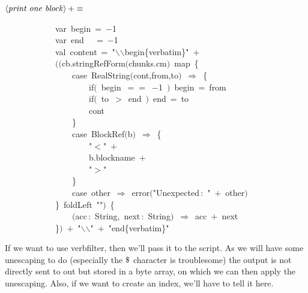 \documentclass[a4paper,12pt]{article}
\begin{document}
$\left<\mbox{\emph{print one block}}\right>+\equiv$
\begin{program}~~~~~~~~~~~~{\vem var}~begin~=~$-$1
\\~~~~~~~~~~~~{\vem var}~end~~~=~$-$1
\\~~~~~~~~~~~~{\vem val}~content~=~"$\backslash$$\backslash$begin{\small\{}verbatim{\small\}}"~$+$
\\~~~~~~~~~~~~$($$($cb.stringRefForm$($chunks.cm$)$~map~{\small\{}
\\~~~~~~~~~~~~~~~~{\vem case}~RealString$($cont,from,to$)$~$\Rightarrow$~{\small\{}
\\~~~~~~~~~~~~~~~~~~~~{\vem if}$($~begin~$==$~$-$1~$)$~begin~=~from
\\[0.5em]~~~~~~~~~~~~~~~~~~~~{\vem if}$($~to~$>$~end~$)$~end~=~to
\\[0.5em]~~~~~~~~~~~~~~~~~~~~cont
\\~~~~~~~~~~~~~~~~{\small\}}
\\~~~~~~~~~~~~~~~~{\vem case}~BlockRef$($b$)$~$\Rightarrow$~{\small\{}
\\~~~~~~~~~~~~~~~~~~~~"$<$"~$+$
\\~~~~~~~~~~~~~~~~~~~~b.blockname~$+$
\\~~~~~~~~~~~~~~~~~~~~"$>$"
\\~~~~~~~~~~~~~~~~{\small\}}
\\~~~~~~~~~~~~~~~~{\vem case}~other~$\Rightarrow$~error$($"Unexpected\,{\rm :}~"~$+$~other$)$
\\~~~~~~~~~~~~{\small\}}~foldLeft~""$)$~{\small\{}
\\~~~~~~~~~~~~~~~~$($acc\,{\rm :}~String,~next\,{\rm :}~String$)$~$\Rightarrow$~acc~$+$~next
\\~~~~~~~~~~~~{\small\}}$)$~$+$~"$\backslash$$\backslash$"~$+$~"end{\small\{}verbatim{\small\}}"
\\[0.5em]\end{program}


If we want to use verbfilter, then we'll pass it to the script.
As we will have some unescaping to do (especially the $\mbox{\$}$
character is troublesome) the output is not directly sent to
out but stored in a byte array, on which we can then apply the
unescaping. Also, if we want to create an index, we'll have to tell
it here.
\end{document}
